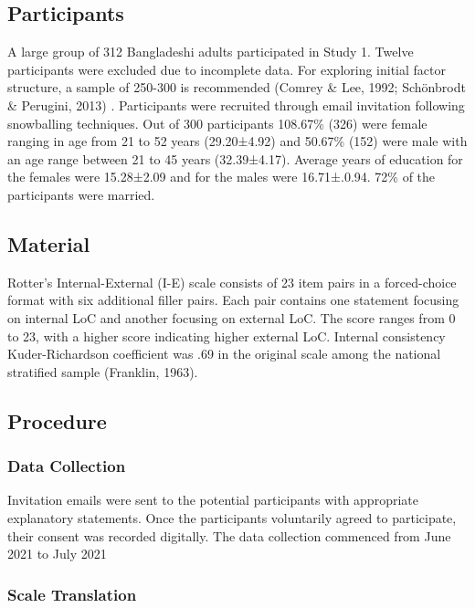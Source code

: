 \documentclass[
  man]{apa6}
\begin{document}
\hypertarget{participants}{%
\subsection{Participants}\label{participants}}

A large group of 312 Bangladeshi adults participated in Study 1. Twelve participants were excluded due to incomplete data. For exploring initial factor structure, a sample of 250-300 is recommended (Comrey \& Lee, 1992; Schönbrodt \& Perugini, 2013) . Participants were recruited through email invitation following snowballing techniques. Out of 300 participants 108.67\% (326) were female ranging in age from 21 to 52 years (29.20±4.92) and 50.67\% (152) were male with an age range between 21 to 45 years (32.39±4.17). Average years of education for the females were 15.28±2.09 and for the males were 16.71±.0.94. 72\% of the participants were married.

\hypertarget{material}{%
\subsection{Material}\label{material}}

Rotter's Internal-External (I-E) scale consists of 23 item pairs in a forced-choice format with six additional filler pairs. Each pair contains one statement focusing on internal LoC and another focusing on external LoC. The score ranges from 0 to 23, with a higher score indicating higher external LoC. Internal consistency Kuder-Richardson coefficient was .69 in the original scale among the national stratified sample (Franklin, 1963).

\hypertarget{procedure}{%
\subsection{Procedure}\label{procedure}}

\hypertarget{data-collection}{%
\subsubsection{Data Collection}\label{data-collection}}

Invitation emails were sent to the potential participants with appropriate explanatory statements. Once the participants voluntarily agreed to participate, their consent was recorded digitally. The data collection commenced from June 2021 to July 2021

\hypertarget{scale-translation}{%
\subsubsection{Scale Translation}\label{scale-translation}}
\end{document}
